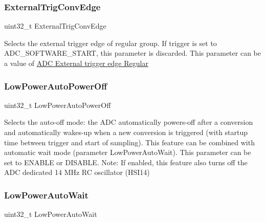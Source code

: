 \subsubsection{\texorpdfstring{External\+Trig\+Conv\+Edge}{ExternalTrigConvEdge}}
{\footnotesize\ttfamily uint32\+\_\+t External\+Trig\+Conv\+Edge}

Selects the external trigger edge of regular group. If trigger is set to A\+D\+C\+\_\+\+S\+O\+F\+T\+W\+A\+R\+E\+\_\+\+S\+T\+A\+RT, this parameter is discarded. This parameter can be a value of \hyperlink{group___a_d_c___external__trigger__edge___regular}{A\+DC External trigger edge Regular} \mbox{\label{struct_a_d_c___init_type_def_aec71cb32439e31735b089f2736344293}} 
\subsubsection{\texorpdfstring{Low\+Power\+Auto\+Power\+Off}{LowPowerAutoPowerOff}}
{\footnotesize\ttfamily uint32\+\_\+t Low\+Power\+Auto\+Power\+Off}

Selects the auto-\/off mode\+: the A\+DC automatically powers-\/off after a conversion and automatically wakes-\/up when a new conversion is triggered (with startup time between trigger and start of sampling). This feature can be combined with automatic wait mode (parameter \textquotesingle{}Low\+Power\+Auto\+Wait\textquotesingle{}). This parameter can be set to E\+N\+A\+B\+LE or D\+I\+S\+A\+B\+LE. Note\+: If enabled, this feature also turns off the A\+DC dedicated 14 M\+Hz RC oscillator (H\+S\+I14) \mbox{\label{struct_a_d_c___init_type_def_a434598c5a9cc1d6e95df613945d5027c}} 
\subsubsection{\texorpdfstring{Low\+Power\+Auto\+Wait}{LowPowerAutoWait}}
{\footnotesize\ttfamily uint32\+\_\+t Low\+Power\+Auto\+Wait}

